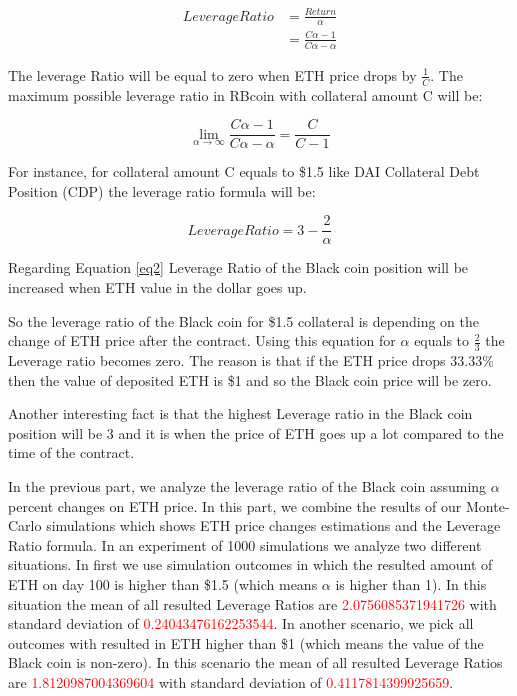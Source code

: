 \begin{equation} \label{eq2}
\begin{split}
Leverage Ratio & = \frac{Return}{\alpha} \\
 & = \frac{C\alpha-1}{C\alpha-\alpha}
\end{split}
\end{equation}

The leverage Ratio will be equal to zero when ETH price drops by $ \frac{1}{C} $. The maximum possible leverage ratio in RBcoin with collateral amount C will be:

$$\lim_{\alpha\to\infty} \frac{C\alpha-1}{C\alpha-\alpha} = \frac{C}{C-1}$$

For instance, for collateral amount C equals to \$1.5 like DAI Collateral Debt Position (CDP) the leverage ratio formula will be:

\[Leverage Ratio = 3- \frac{2}{\alpha}\]


Regarding Equation \ref{eq2} Leverage Ratio of the Black coin position will be increased when ETH value in the dollar goes up.

So the leverage ratio of the Black coin for \$1.5 collateral is depending on the change of ETH price after the contract. Using this equation for $\alpha$ equals to $\frac{2}{3} $ the Leverage ratio becomes zero. The reason is that if the ETH price drops 33.33\% then the value of deposited ETH is \$1 and so the Black coin price will be zero. 

Another interesting fact is that the highest Leverage ratio in the Black coin position will be 3 and it is when the price of ETH goes up a lot compared to the time of the contract.

In the previous part, we analyze the leverage ratio of the Black coin assuming $\alpha$ percent changes on ETH price. In this part, we combine the results of our Monte-Carlo simulations which shows ETH price changes estimations and the Leverage Ratio formula. 
In an experiment of 1000 simulations we analyze two different situations. In first we use simulation outcomes in which the resulted amount of ETH on day 100 is higher than \$1.5 (which means $\alpha$ is higher than 1). In this situation the mean of all resulted Leverage Ratios are \textcolor{red}{2.0756085371941726} with standard deviation of \textcolor{red}{0.24043476162253544}. In another scenario, we pick all outcomes with resulted in ETH higher than \$1 (which means the value of the Black coin is non-zero). In this scenario  the mean of all resulted Leverage Ratios are \textcolor{red}{1.8120987004369604} with standard deviation of \textcolor{red}{0.4117814399925659}.

